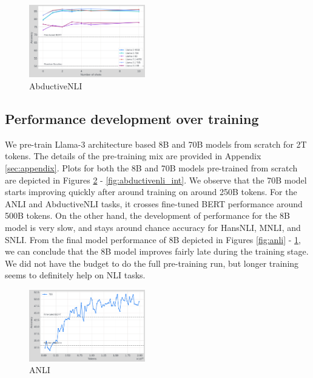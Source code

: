 \begin{figure}[t]
    \centering
    \includegraphics[width=0.45\textwidth]{nli_plots/abductivenli.png}
    \caption{AbductiveNLI}
    \label{fig:abductivenli}
\end{figure}

\subsection{Performance development over training}

We pre-train Llama-3 architecture based 8B and 70B models from scratch for 2T tokens. The details of the pre-training mix are provided in Appendix \ref{sec:appendix}. Plots for both the 8B and 70B models pre-trained from scratch are depicted in Figures \ref{fig:anli_int} - \ref{fig:abductivenli_int}. We observe that the 70B model starts improving quickly after around training on around 250B tokens. For the ANLI and AbductiveNLI tasks, it crosses fine-tuned BERT performance around 500B tokens. On the other hand, the development of performance for the 8B model is very slow, and stays around chance accuracy for HansNLI, MNLI, and SNLI. From the final model performance of 8B depicted in Figures \ref{fig:anli} - \ref{fig:abductivenli}, we can conclude that the 8B model improves fairly late during the training stage. We did not have the budget to do the full pre-training run, but longer training seems to definitely help on NLI tasks.

\begin{figure}[t]
    \centering
    \includegraphics[width=0.45\textwidth]{nli_plots/anli_intermediate.png}
    \caption{ANLI}
    \label{fig:anli_int}
\end{figure}

